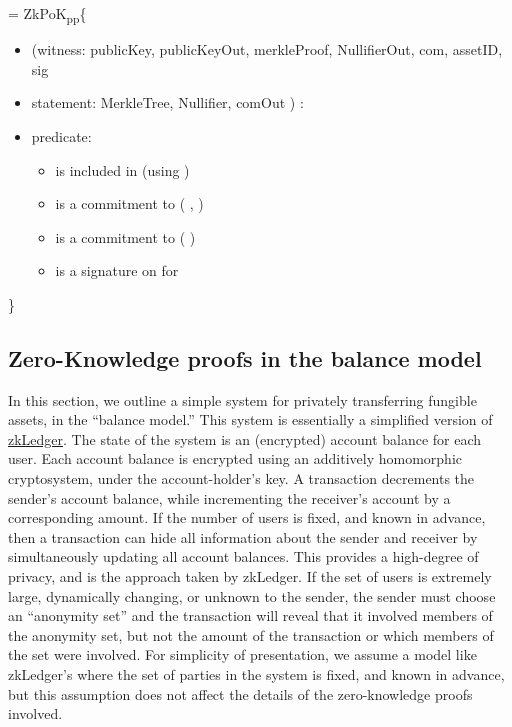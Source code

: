  = ZkPoK\textsubscript{pp}\{  
\begin{itemize}
    \item[] (witness: publicKey, publicKeyOut, merkleProof, NullifierOut, com, assetID, sig
    \item[] statement: MerkleTree, Nullifier, comOut ) :  
    \item[] predicate: 
		\begin{itemize} 
			\item {} is included in  (using )
			\item {} is a commitment to ( ,  )
			\item {} is a commitment to (  )
			\item {} is a signature on  for 
		\end{itemize}
\end{itemize}
\}



\subsection{Zero-Knowledge proofs in the balance model}
\label{apps:asset-transfer:zkps-balance-model}

In this section, we outline a simple system for privately transferring fungible assets, in the ``balance model.''  This system is essentially a simplified version of \href{https://www.usenix.org/system/files/conference/nsdi18/nsdi18-narula.pdf}{zkLedger}.  The state of the system is an (encrypted) account balance for each user.  Each account balance is encrypted using an additively homomorphic cryptosystem, under the account-holder's key.  A transaction decrements the sender's account balance, while incrementing the receiver's account by a corresponding amount.  If the number of users is fixed, and known in advance, then a transaction can hide all information about the sender and receiver by simultaneously updating all account balances.  This provides a high-degree of privacy, and is the approach taken by zkLedger.  If the set of users is extremely large, dynamically changing, or unknown to the sender, the sender must choose an ``anonymity set'' and the transaction will reveal that it involved members of the anonymity set, but not the amount of the transaction or which members of the set were involved.  For simplicity of presentation, we assume a model like zkLedger's where the set of parties in the system is fixed, and known in advance, but this assumption does not affect the details of the zero-knowledge proofs involved.

